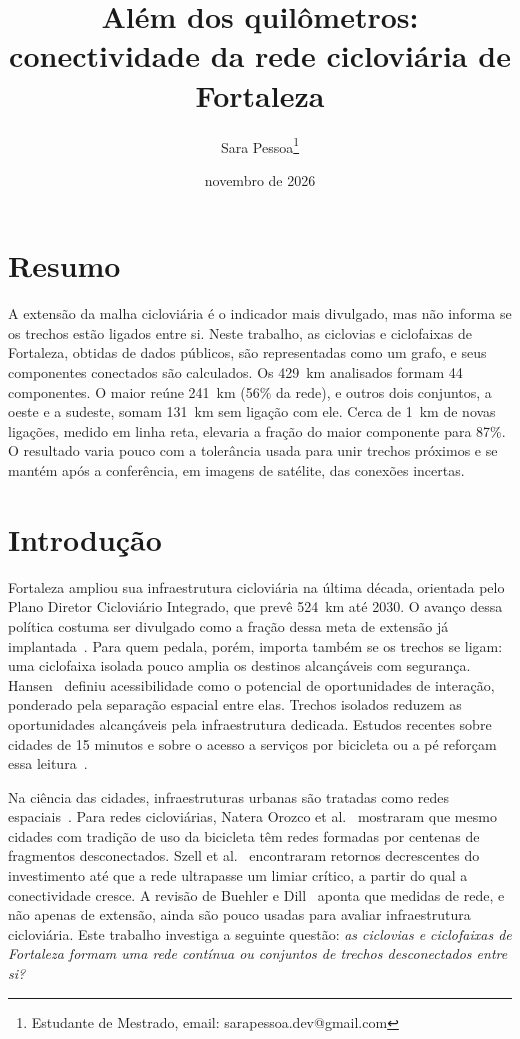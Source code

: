 \documentclass[10pt,twoside,a4paper]{article}
\date{novembro de 2026}
\title{Além dos quilômetros: conectividade da rede cicloviária de Fortaleza}
\author[1]{Sara Pessoa\thanks{Estudante de Mestrado, email: sarapessoa.dev@gmail.com}}
\affil[1]{Universidade de Fortaleza -- Programa de Pós-Graduação em Informática Aplicada}
\begin{document}
\inserirtitulo
\linespread{1.5}%

\section{Resumo}
A extensão da malha cicloviária é o indicador mais divulgado, mas não informa se os trechos estão ligados entre si. Neste trabalho, as ciclovias e ciclofaixas de Fortaleza, obtidas de dados públicos, são representadas como um grafo, e seus componentes conectados são calculados. Os 429~km analisados formam 44 componentes. O maior reúne 241~km (56\% da rede), e outros dois conjuntos, a oeste e a sudeste, somam 131~km sem ligação com ele. Cerca de 1~km de novas ligações, medido em linha reta, elevaria a fração do maior componente para 87\%. O resultado varia pouco com a tolerância usada para unir trechos próximos e se mantém após a conferência, em imagens de satélite, das conexões incertas.

\section{Introdução}
Fortaleza ampliou sua infraestrutura cicloviária na última década, orientada pelo Plano Diretor Cicloviário Integrado, que prevê 524~km até 2030. O avanço dessa política costuma ser divulgado como a fração dessa meta de extensão já implantada~\cite{opovo2022}. Para quem pedala, porém, importa também se os trechos se ligam: uma ciclofaixa isolada pouco amplia os destinos alcançáveis com segurança. Hansen~\cite{hansen1959} definiu acessibilidade como o potencial de oportunidades de interação, ponderado pela separação espacial entre elas. Trechos isolados reduzem as oportunidades alcançáveis pela infraestrutura dedicada. Estudos recentes sobre cidades de 15 minutos e sobre o acesso a serviços por bicicleta ou a pé reforçam essa leitura~\cite{bruno2024,xu2020}.

Na ciência das cidades, infraestruturas urbanas são tratadas como redes espaciais~\cite{bettencourt2021,maia2023}. Para redes cicloviárias, Natera Orozco et al.~\cite{natera2020} mostraram que mesmo cidades com tradição de uso da bicicleta têm redes formadas por centenas de fragmentos desconectados. Szell et al.~\cite{szell2022} encontraram retornos decrescentes do investimento até que a rede ultrapasse um limiar crítico, a partir do qual a conectividade cresce. A revisão de Buehler e Dill~\cite{buehler2016} aponta que medidas de rede, e não apenas de extensão, ainda são pouco usadas para avaliar infraestrutura cicloviária. Este trabalho investiga a seguinte questão: \emph{as ciclovias e ciclofaixas de Fortaleza formam uma rede contínua ou conjuntos de trechos desconectados entre si?}
\end{document}
